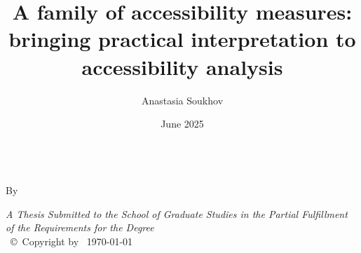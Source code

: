 \documentclass[
11pt, %
oneside, %
english, %
singlespacing, %
]{macthesis} %
\title{A family of accessibility measures: bringing practical interpretation to accessibility analysis}
\author{Anastasia Soukhov}
\date{June 2025}
\def\blankpage{%
      \clearpage%
      \thispagestyle{empty}%
      \addtocounter{page}{-1}%
      \null%
      \clearpage}
\begin{document}
\sloppy

\frontmatter %

\pagestyle{plain} %

\vspace{6cm}
\begin{center}
\ttitle
\end{center}
\clearpage

\begin{center}

\vfill
\textsc{\Large \ttitle} \\

\vfill
{By \authorname\, \bdeg \, \mdeg }


 \vfill
{\large \textit{A Thesis Submitted to the School of Graduate Studies in the Partial Fulfillment of the Requirements for the Degree \degreename}}\\

\vfill
{\large \univname\, \copyright\, Copyright by \authorname\, \today}\\[4cm] %

\end{center}
\blankpage
\clearpage


\vspace*{0.2\textheight}

\bigbreak
\end{document}
